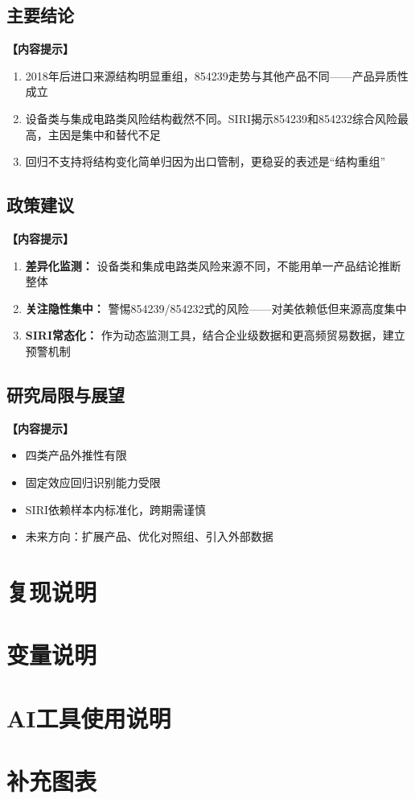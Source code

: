 \documentclass[UTF8,a4paper,12pt]{ctexart}
\begin{document}
\subsection{主要结论}
\noindent\textbf{【内容提示】}
\begin{enumerate}[nosep]
    \item 2018年后进口来源结构明显重组，854239走势与其他产品不同——产品异质性成立
    \item 设备类与集成电路类风险结构截然不同。SIRI揭示854239和854232综合风险最高，主因是集中和替代不足
    \item 回归不支持将结构变化简单归因为出口管制，更稳妥的表述是“结构重组”
\end{enumerate}

\subsection{政策建议}
\noindent\textbf{【内容提示】}
\begin{enumerate}[nosep]
    \item \textbf{差异化监测：} 设备类和集成电路类风险来源不同，不能用单一产品结论推断整体
    \item \textbf{关注隐性集中：} 警惕854239/854232式的风险——对美依赖低但来源高度集中
    \item \textbf{SIRI常态化：} 作为动态监测工具，结合企业级数据和更高频贸易数据，建立预警机制
\end{enumerate}

\subsection{研究局限与展望}
\noindent\textbf{【内容提示】}
\begin{itemize}[nosep]
    \item 四类产品外推性有限
    \item 固定效应回归识别能力受限
    \item SIRI依赖样本内标准化，跨期需谨慎
    \item 未来方向：扩展产品、优化对照组、引入外部数据
\end{itemize}




\appendix
\section{复现说明}

\section{变量说明}

\section{AI工具使用说明}

\section{补充图表}
\end{document}
